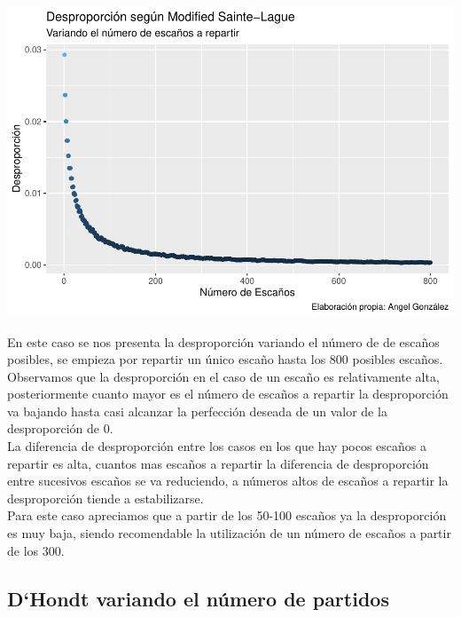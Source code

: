 \documentclass[12pt,a4paper,]{book}
\numberwithin{dummy}{section}
\theoremstyle{ocrenumbox}
\theoremstyle{blacknumex}
\theoremstyle{blacknumbox}
\theoremstyle{ocrenum}
\theoremstyle{ocrenum}
\begin{document}
\begin{center}\includegraphics[width=0.95\linewidth]{figurasR/unnamed-chunk-16-1} \end{center}

En este caso se nos presenta la desproporción variando el número de de
escaños posibles, se empieza por repartir un único escaño hasta los 800
posibles escaños. Observamos que la desproporción en el caso de un
escaño es relativamente alta, posteriormente cuanto mayor es el número
de escaños a repartir la desproporción va bajando hasta casi alcanzar la
perfección deseada de un valor de la desproporción de 0.\\
La diferencia de desproporción entre los casos en los que hay pocos
escaños a repartir es alta, cuantos mas escaños a repartir la diferencia
de desproporción entre sucesivos escaños se va reduciendo, a números
altos de escaños a repartir la desproporción tiende a estabilizarse.\\
Para este caso apreciamos que a partir de los 50-100 escaños ya la
desproporción es muy baja, siendo recomendable la utilización de un
número de escaños a partir de los 300.

\hypertarget{dhondt-variando-el-nuxfamero-de-partidos}{%
\subsection{D`Hondt variando el número de
partidos}\label{dhondt-variando-el-nuxfamero-de-partidos}}
\end{document}
